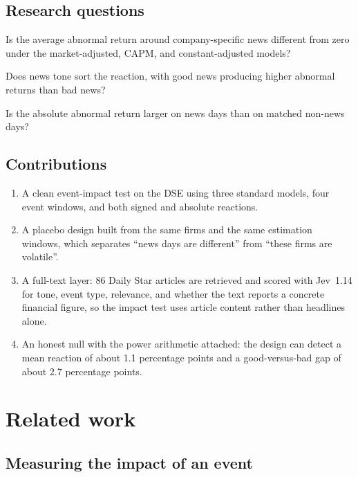 \documentclass[10pt,twocolumn,a4paper]{article}
\begin{document}
\subsection{Research questions}

\begin{description}[leftmargin=2.6em,style=sameline,itemsep=2pt]
\item[RQ1.] Is the average abnormal return around company-specific news different from zero under the
market-adjusted, CAPM, and constant-adjusted models?
\item[RQ2.] Does news tone sort the reaction, with good news producing higher abnormal returns than bad
news?
\item[RQ3.] Is the absolute abnormal return larger on news days than on matched non-news days?
\end{description}

\subsection{Contributions}

\begin{enumerate}
\item A clean event-impact test on the DSE using three standard models, four event windows, and both
signed and absolute reactions.
\item A placebo design built from the same firms and the same estimation windows, which separates
``news days are different'' from ``these firms are volatile''.
\item A full-text layer: 86 Daily Star articles are retrieved and scored with Jev~1.14 for tone, event
type, relevance, and whether the text reports a concrete financial figure, so the impact test uses
article content rather than headlines alone.
\item An honest null with the power arithmetic attached: the design can detect a mean reaction of about
1.1 percentage points and a good-versus-bad gap of about 2.7 percentage points.
\end{enumerate}

\section{Related work}

\subsection{Measuring the impact of an event}
\end{document}
